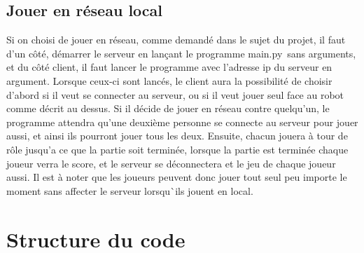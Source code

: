 \documentclass{article}
\begin{document}
	 \subsection{Jouer en r\'eseau local}
	 Si on choisi de jouer en r\'eseau, comme demand\'e dans le sujet du projet, il faut d’un c\^ot\'e, d\'emarrer le serveur en lan\c cant le programme \guillemotleft main.py\guillemotright \ sans arguments, et du c\^ot\'e client, il faut lancer le programme avec l’adresse ip du serveur en argument.
	 \newline Lorsque ceux-ci sont lanc\'es, le client aura la possibilit\'e de choisir d’abord si il veut se connecter au serveur, ou si il veut jouer seul face au robot comme d\'ecrit au dessus. 
	 \newline Si il d\'ecide de jouer en r\'eseau contre quelqu\textquoteright un, le programme attendra qu\textquoteright une deuxième personne se connecte au serveur pour jouer aussi, et ainsi ils pourront jouer tous les deux. 
	 \newline Ensuite, chacun jouera \`a tour de r\^ole jusqu\textquoteright a ce que la partie soit termin\'ee, lorsque la partie est termin\'ee chaque joueur verra le score, et le serveur se d\'econnectera et le jeu de chaque joueur aussi. 
	 \newline Il est \`a noter que les joueurs peuvent donc jouer tout seul peu importe le moment sans affecter le serveur lorsqu\`\ ils jouent en local.

\section{Structure du code}
\end{document}
